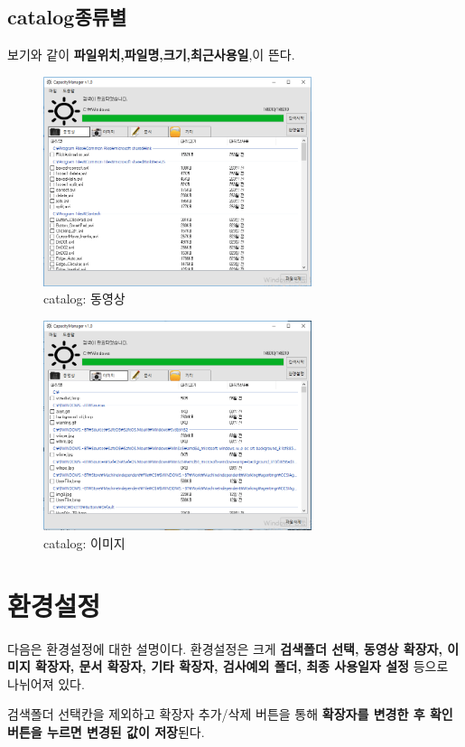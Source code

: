 \documentclass[a4paper, 13pt]{article} %
\begin{document}
		\subsection{catalog종류별}
		보기와 같이 \textbf{파일위치,파일명,크기,최근사용일},이 뜬다. 
	\begin{figure}[h]
		\centering
		\includegraphics[width=0.7\textwidth]{Figures/avi}
		\caption{catalog: 동영상}
		\label{fig:avi}
	\end{figure}
	\begin{figure}[h]
		\centering
		\includegraphics[width=0.7\textwidth]{Figures/jpg}
		\caption{catalog: 이미지}
		\label{fig:jpg}
	\end{figure}
	\section{환경설정}
	다음은 환경설정에 대한 설명이다.	환경설정은 크게 \textbf{검색폴더 선택, 동영상 확장자, 이미지 확장자, 문서 확장자, 기타 확장자, 검사예외 폴더, 최종 사용일자 설정} 등으로 나뉘어져 있다.
	
	검색폴더 선택칸을 제외하고 확장자 추가/삭제 버튼을 통해 \textbf{확장자를 변경한 후 확인 버튼을 누르면 변경된 값이 저장}된다.
	
\end{document}
